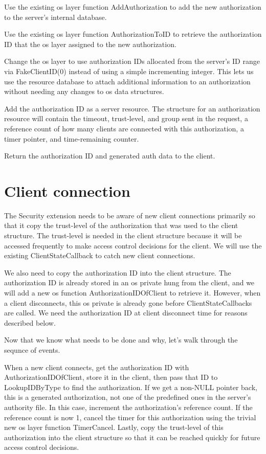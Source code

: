 \documentclass{article}
\begin{document}
Use the existing os layer function AddAuthorization to add the new
authorization to the server's internal database.

Use the existing os layer function AuthorizationToID to retrieve the
authorization ID that the os layer assigned to the new authorization.

Change the os layer to use authorization IDs allocated from the
server's ID range via FakeClientID(0) instead of using a simple
incrementing integer.  This lets us use the resource database to
attach additional information to an authorization without needing any
changes to os data structures.

Add the authorization ID as a server resource.  The structure for an
authorization resource will contain the timeout, trust-level, and
group sent in the request, a reference count of how many clients are
connected with this authorization, a timer pointer, and time-remaining
counter.

Return the authorization ID and generated auth data to the client.


\section{Client connection}

The Security extension needs to be aware of new client connections
primarily so that it copy the trust-level of the authorization that
was used to the client structure.  The trust-level is needed in the
client structure because it will be accessed frequently to make access
control decisions for the client.  We will use the existing
ClientStateCallback to catch new client connections.

We also need to copy the authorization ID into the client structure.
The authorization ID is already stored in an os private hung from the
client, and we will add a new os function AuthorizationIDOfClient to
retrieve it.  However, when a client disconnects, this os private is
already gone before ClientStateCallbacks are called.  We need the
authorization ID at client disconnect time for reasons described
below.

Now that we know what needs to be done and why, let's walk through
the sequnce of events.

When a new client connects, get the authorization ID with
AuthorizationIDOfClient, store it in the client, then pass that ID to
LookupIDByType to find the authorization.  If we get a non-NULL
pointer back, this is a generated authorization, not one of the
predefined ones in the server's authority file.  In this case,
increment the authorization's reference count.  If the reference count
is now 1, cancel the timer for this authorization using the trivial
new os layer function TimerCancel.  Lastly, copy the trust-level of
this authorization into the client structure so that it can be reached
quickly for future access control decisions.
\end{document}
